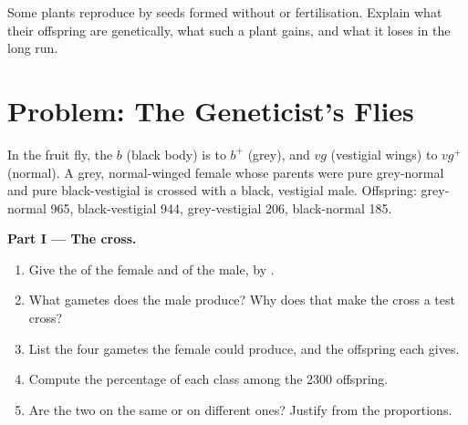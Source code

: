 \begin{exercise}[$\star\star\star$]\label{exo:g12:meiosis-genetic-shuffling:15}
Some plants reproduce by seeds formed without  or
fertilisation. Explain what their offspring are genetically, what such
a plant gains, and what it loses in the long run.
\end{exercise}

\section{Problem: The Geneticist's Flies}

\begin{problem}
\label{pb:g12:meiosis-genetic-shuffling:1}
In the fruit fly, the  $b$ (black body) is  to $b^+$
(grey), and $vg$ (vestigial wings)  to $vg^+$ (normal). A
grey, normal-winged female whose parents were pure grey-normal and
pure black-vestigial is crossed with a black, vestigial male. Offspring:
grey-normal 965, black-vestigial 944, grey-vestigial 206, black-normal
185.

\medskip
\noindent\textbf{Part I --- The cross.}
\begin{enumerate}
  \item Give the  of the female and of the male,  by .
  \item What gametes does the male produce? Why does that make the
        cross a test cross?
  \item List the four gametes the female could produce, and the
        offspring each gives.
  \item Compute the percentage of each class among the 2300 offspring.
  \item Are the two  on the same  or on different ones?
        Justify from the proportions.
\end{enumerate}


\end{problem}
